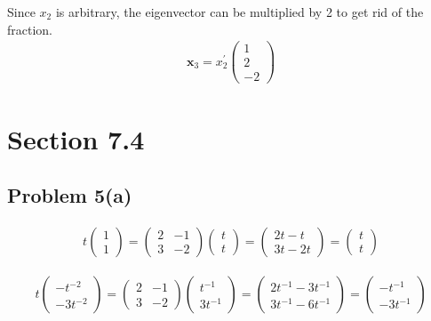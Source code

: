 \documentclass[12pt]{article}
\begin{document}
Since \(x_{2}\) is arbitrary, the eigenvector can be multiplied by 2 to get rid of
the fraction. 
\begin{align*}
\mathbf{x}_{3}=x_{2}^{\prime}\left(\begin{array}{c}
1 \\
2 \\
-2
\end{array}\right)
\end{align*}

\section*{Section 7.4}
\label{sec:org3d350ba}
\subsection*{Problem 5(a)}
\label{sec:org7d584b8}
\begin{align*}
        t \begin{pmatrix}
                1 \\
                1
        \end{pmatrix} =
        \begin{pmatrix}
                2 & -1 \\
                3 & -2
        \end{pmatrix}
        \begin{pmatrix}
                t \\
                t
        \end{pmatrix}
        = \begin{pmatrix}
                2t-t \\
                3t-2t
        \end{pmatrix} =
        \begin{pmatrix}
                t \\
                t
        \end{pmatrix}
\end{align*}

\begin{align*}
        t \begin{pmatrix}
                -t^{-2} \\
                -3t^{-2}
        \end{pmatrix} =
        \begin{pmatrix}
                2 & -1 \\
                3 & -2
        \end{pmatrix}
        \begin{pmatrix}
                t^{-1} \\
                3t^{-1}
        \end{pmatrix}
        = \begin{pmatrix}
                2t^{-1}-3t^{-1} \\
                3t^{-1}-6t^{-1}
        \end{pmatrix} =
        \begin{pmatrix}
                -t^{-1} \\
                -3t^{-1}
        \end{pmatrix}
\end{align*}
\end{document}
